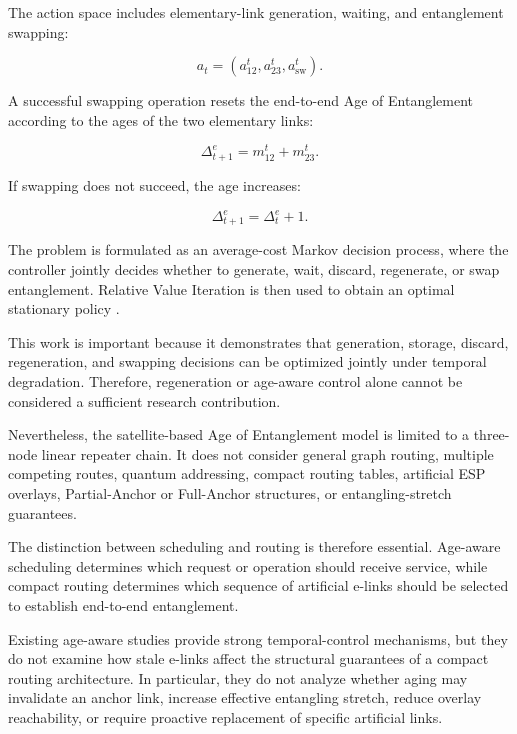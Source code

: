 The action space includes elementary-link generation, waiting, and entanglement swapping:

\begin{equation}
    a_t
    =
    \left(
    a_{12}^{t},
    a_{23}^{t},
    a_{\mathrm{sw}}^{t}
    \right).
\end{equation}

A successful swapping operation resets the end-to-end Age of Entanglement according to the ages of the two elementary links:

\begin{equation}
    \Delta_{t+1}^{e}
    =
    m_{12}^{t}
    +
    m_{23}^{t}.
\end{equation}

If swapping does not succeed, the age increases:

\begin{equation}
    \Delta_{t+1}^{e}
    =
    \Delta_t^{e}
    +
    1.
\end{equation}

The problem is formulated as an average-cost Markov decision process, where the controller jointly decides whether to generate, wait, discard, regenerate, or swap entanglement. Relative Value Iteration is then used to obtain an optimal stationary policy \cite{ceran2026age}.

This work is important because it demonstrates that generation, storage, discard, regeneration, and swapping decisions can be optimized jointly under temporal degradation. Therefore, regeneration or age-aware control alone cannot be considered a sufficient research contribution.

Nevertheless, the satellite-based Age of Entanglement model is limited to a three-node linear repeater chain. It does not consider general graph routing, multiple competing routes, quantum addressing, compact routing tables, artificial ESP overlays, Partial-Anchor or Full-Anchor structures, or entangling-stretch guarantees.

The distinction between scheduling and routing is therefore essential. Age-aware scheduling determines which request or operation should receive service, while compact routing determines which sequence of artificial e-links should be selected to establish end-to-end entanglement.

Existing age-aware studies provide strong temporal-control mechanisms, but they do not examine how stale e-links affect the structural guarantees of a compact routing architecture. In particular, they do not analyze whether aging may invalidate an anchor link, increase effective entangling stretch, reduce overlay reachability, or require proactive replacement of specific artificial links.

